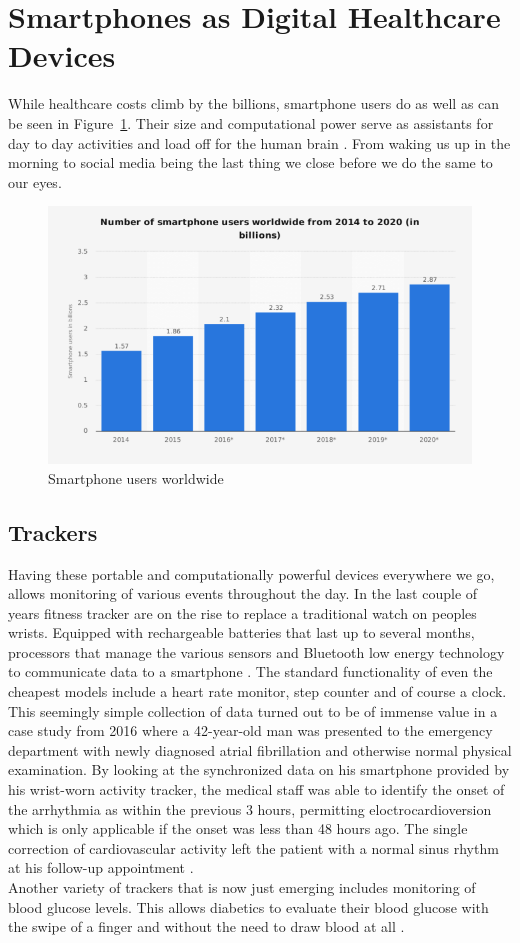 \section{Smartphones as Digital Healthcare Devices}
While healthcare costs climb by the billions, smartphone users do as well as can be seen in Figure~\ref{fig:graphical_statistics_of_smartphone_users}. Their size and computational power serve as assistants for day to day activities and load off for the human brain \cite{barr2015brain}. From waking us up in the morning to social media being the last thing we close before we do the same to our eyes.
\begin{figure}[htpb]
    \centering
    \includegraphics[width=0.8\linewidth]{media/Graphical-statistics-of-smartphone-users.png}
    \caption{Smartphone users worldwide \cite{numSmartphones}}%
    \label{fig:graphical_statistics_of_smartphone_users}
\end{figure}
\label{sec:smartphoneChances}
\subsection{Trackers}
Having these portable and computationally powerful devices everywhere we go, allows monitoring of various events throughout the day. In the last couple of years fitness tracker are on the rise to replace a traditional watch on peoples wrists. Equipped with rechargeable batteries that last up to several months, processors that manage the various sensors and Bluetooth low energy technology to communicate data to a smartphone \cite{trackerDef}. The standard functionality of even the cheapest models include a heart rate monitor, step counter and of course a clock. This seemingly simple collection of data turned out to be of immense value in a case study from 2016 where a 42-year-old man was presented to the emergency department with newly diagnosed atrial fibrillation and otherwise normal physical examination. By looking at the synchronized data on his smartphone provided by his wrist-worn activity tracker, the medical staff was able to identify the onset of the arrhythmia as within the previous 3 hours, permitting eloctrocardioversion which is only applicable if the onset was less than 48 hours ago. The single correction of cardiovascular activity left the patient with a normal sinus rhythm at his follow-up appointment \cite{rudner2016interrogation}. \\
Another variety of trackers that is now just emerging includes monitoring of blood glucose levels. This allows diabetics to evaluate their blood glucose with the swipe of a finger and without the need to draw blood at all \cite{glucoseTracker}.
